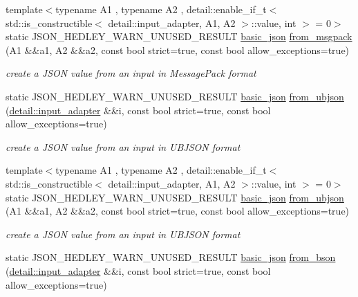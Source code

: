 \begin{DoxyCompactItemize}
{\footnotesize template$<$typename A1 , typename A2 , detail\+::enable\+\_\+if\+\_\+t$<$ std\+::is\+\_\+constructible$<$ detail\+::input\+\_\+adapter, A1, A2 $>$\+::value, int $>$  = 0$>$ }\\static J\+S\+O\+N\+\_\+\+H\+E\+D\+L\+E\+Y\+\_\+\+W\+A\+R\+N\+\_\+\+U\+N\+U\+S\+E\+D\+\_\+\+R\+E\+S\+U\+LT \hyperlink{classnlohmann_1_1basic__json}{basic\+\_\+json} \hyperlink{classnlohmann_1_1basic__json_a022b65246f82c87526940248dc9df6f5}{from\+\_\+msgpack} (A1 \&\&a1, A2 \&\&a2, const bool strict=true, const bool allow\+\_\+exceptions=true)
\begin{DoxyCompactList}\small\item\em create a J\+S\+ON value from an input in Message\+Pack format \end{DoxyCompactList}\item 
static J\+S\+O\+N\+\_\+\+H\+E\+D\+L\+E\+Y\+\_\+\+W\+A\+R\+N\+\_\+\+U\+N\+U\+S\+E\+D\+\_\+\+R\+E\+S\+U\+LT \hyperlink{classnlohmann_1_1basic__json}{basic\+\_\+json} \hyperlink{classnlohmann_1_1basic__json_a1ed52b463d2ef14c85ed076467168c72}{from\+\_\+ubjson} (\hyperlink{classnlohmann_1_1detail_1_1input__adapter}{detail\+::input\+\_\+adapter} \&\&i, const bool strict=true, const bool allow\+\_\+exceptions=true)
\begin{DoxyCompactList}\small\item\em create a J\+S\+ON value from an input in U\+B\+J\+S\+ON format \end{DoxyCompactList}\item 
{\footnotesize template$<$typename A1 , typename A2 , detail\+::enable\+\_\+if\+\_\+t$<$ std\+::is\+\_\+constructible$<$ detail\+::input\+\_\+adapter, A1, A2 $>$\+::value, int $>$  = 0$>$ }\\static J\+S\+O\+N\+\_\+\+H\+E\+D\+L\+E\+Y\+\_\+\+W\+A\+R\+N\+\_\+\+U\+N\+U\+S\+E\+D\+\_\+\+R\+E\+S\+U\+LT \hyperlink{classnlohmann_1_1basic__json}{basic\+\_\+json} \hyperlink{classnlohmann_1_1basic__json_a46afafed69ed4c8ae797afb8445fd42f}{from\+\_\+ubjson} (A1 \&\&a1, A2 \&\&a2, const bool strict=true, const bool allow\+\_\+exceptions=true)
\begin{DoxyCompactList}\small\item\em create a J\+S\+ON value from an input in U\+B\+J\+S\+ON format \end{DoxyCompactList}\item 
static J\+S\+O\+N\+\_\+\+H\+E\+D\+L\+E\+Y\+\_\+\+W\+A\+R\+N\+\_\+\+U\+N\+U\+S\+E\+D\+\_\+\+R\+E\+S\+U\+LT \hyperlink{classnlohmann_1_1basic__json}{basic\+\_\+json} \hyperlink{classnlohmann_1_1basic__json_a0524486cd0b36a47448df882ec0d5e7b}{from\+\_\+bson} (\hyperlink{classnlohmann_1_1detail_1_1input__adapter}{detail\+::input\+\_\+adapter} \&\&i, const bool strict=true, const bool allow\+\_\+exceptions=true)

\end{DoxyCompactItemize}
